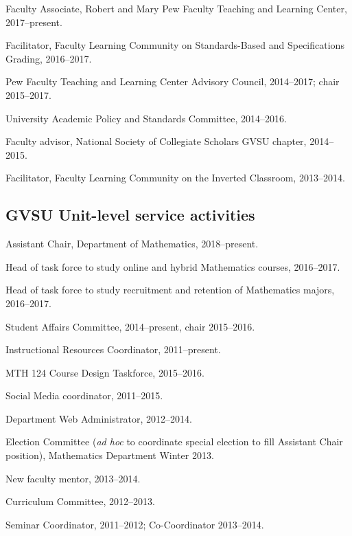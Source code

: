 \documentclass[letterpaper]{article}
\renewenvironment{itemize}{
  \begin{list}{}{
    \setlength{\leftmargin}{1.5em}
	\setlength{\itemsep}{0in}
  }
}{
  \end{list}
}
\begin{document}
\begin{itemize}
  \item Faculty Associate, Robert and Mary Pew Faculty Teaching and Learning Center, 2017--present.
	\item Facilitator, Faculty Learning Community on Standards-Based and Specifications Grading, 2016--2017.
	\item Pew Faculty Teaching and Learning Center Advisory Council, 2014--2017; chair 2015--2017.
	\item University Academic Policy and Standards Committee, 2014--2016.
	\item Faculty advisor, National Society of Collegiate Scholars GVSU chapter, 2014--2015.
	\item Facilitator, Faculty Learning Community on the Inverted Classroom, 2013--2014.
\end{itemize}

\subsection*{GVSU Unit-level service activities}


\begin{itemize}
	\item Assistant Chair, Department of Mathematics, 2018--present. 
	\item Head of task force to study online and hybrid Mathematics courses, 2016--2017.
	\item Head of task force to study recruitment and retention of Mathematics majors, 2016--2017.
	\item Student Affairs Committee, 2014--present, chair 2015--2016.
	\item Instructional Resources Coordinator, 2011--present.
	\item MTH 124 Course Design Taskforce, 2015--2016.
	\item Social Media coordinator, 2011--2015.
	\item Department Web Administrator, 2012--2014.
	\item Election Committee (\emph{ad hoc} to coordinate special election to fill Assistant Chair position), Mathematics Department Winter 2013.
	\item New faculty mentor, 2013--2014.
	\item Curriculum Committee, 2012--2013.
	\item Seminar Coordinator, 2011--2012; Co-Coordinator 2013--2014.
\end{itemize}
\end{document}

